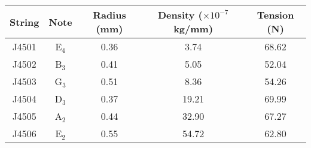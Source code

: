 \begin{tabular}{ccccc}
\toprule
String &    Note &  Radius (mm) &  Density ($\times 10^{-7}$ kg/mm) &  Tension (N) \\
\midrule
 J4501 & E$_{4}$ &         0.36 &                              3.74 &        68.62 \\
 J4502 & B$_{3}$ &         0.41 &                              5.05 &        52.04 \\
 J4503 & G$_{3}$ &         0.51 &                              8.36 &        54.26 \\
 J4504 & D$_{3}$ &         0.37 &                             19.21 &        69.99 \\
 J4505 & A$_{2}$ &         0.44 &                             32.90 &        67.27 \\
 J4506 & E$_{2}$ &         0.55 &                             54.72 &        62.80 \\
\bottomrule
\end{tabular}

